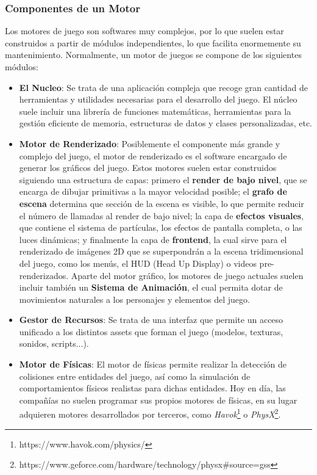 \subsubsection{Componentes de un Motor}
Los motores de juego son softwares muy complejos, por lo que suelen estar construidos a partir de módulos independientes, lo que facilita enormemente su mantenimiento. Normalmente, un motor de juegos se compone de los siguientes módulos\cite{game_engine_architecture}:
\begin{itemize}
\item\textbf{El Nucleo}: Se trata de una aplicación compleja que recoge gran cantidad de herramientas y utilidades necesarias para el desarrollo del juego. El núcleo suele incluir una librería de funciones matemáticas, herramientas para la gestión eficiente de memoria, estructuras de datos y clases personalizadas, etc.
\item\textbf{Motor de Renderizado}: Posiblemente el componente más grande y complejo del juego, el motor de renderizado es el software encargado de generar los gráficos del juego. Estos motores suelen estar construidos siguiendo una estructura de capas: primero el \textbf{render de bajo nivel}, que se encarga de dibujar primitivas a la mayor velocidad posible; el \textbf{grafo de escena} determina que sección de la escena es visible, lo que permite reducir el número de llamadas al render de bajo nivel; la capa de \textbf{efectos visuales}, que contiene el sistema de partículas, los efectos de pantalla completa, o las luces dinámicas; y finalmente la capa de \textbf{frontend}, la cual sirve para el renderizado de imágenes 2D que se superpondrán a la escena tridimensional del juego, como los menús, el HUD (Head Up Display) o videos pre-renderizados. Aparte del motor gráfico, los motores de juego actuales suelen incluir también un \textbf{Sistema de Animación}, el cual permita dotar de movimientos naturales a los personajes y elementos del juego. 
\item\textbf{Gestor de Recursos}: Se trata de una interfaz que permite un acceso unificado a los distintos assets que forman el juego (modelos, texturas, sonidos, scripts...). 
\item\textbf{Motor de Físicas}: El motor de físicas permite realizar la detección de colisiones entre entidades del juego, así como la simulación de comportamientos físicos realistas para dichas entidades. Hoy en día, las compañías no suelen programar sus propios motores de físicas, en su lugar adquieren motores desarrollados por terceros, como \textit{Havok}\footnote{https://www.havok.com/physics/} o \textit{PhysX}\footnote{https://www.geforce.com/hardware/technology/physx\#source=gss}.

\end{itemize}
